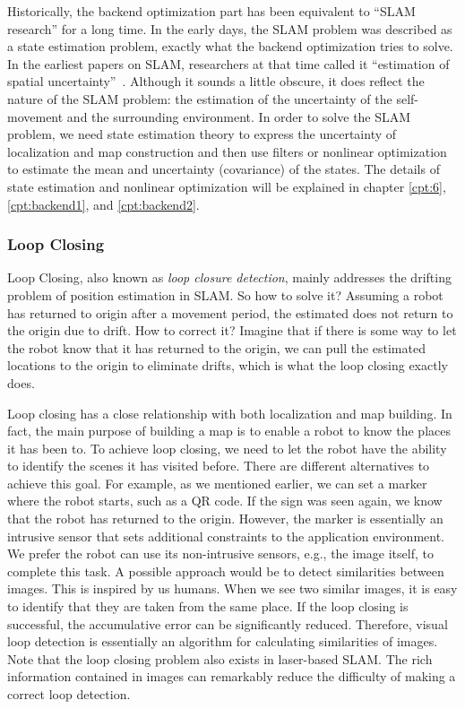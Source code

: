 Historically, the backend optimization part has been equivalent to ``SLAM research'' for a long time. In the early days, the SLAM problem was described as a state estimation problem, exactly what the backend optimization tries to solve. In the earliest papers on SLAM, researchers at that time called it ``estimation of spatial uncertainty''~\cite{Smith1986, Smith1990}. Although it sounds a little obscure, it does reflect the nature of the SLAM problem: the estimation of the uncertainty of the self-movement and the surrounding environment. In order to solve the SLAM problem, we need state estimation theory to express the uncertainty of localization and map construction and then use filters or nonlinear optimization to estimate the mean and uncertainty (covariance) of the states. The details of state estimation and nonlinear optimization will be explained in chapter \ref{cpt:6}, \ref{cpt:backend1}, and \ref{cpt:backend2}.

\subsubsection{Loop Closing}
Loop Closing, also known as \textit{loop closure detection}, mainly addresses the drifting problem of position estimation in SLAM. So how to solve it? Assuming a robot has returned to origin after a movement period, the estimated does not return to the origin due to drift. How to correct it? Imagine that if there is some way to let the robot know that it has returned to the origin, we can pull the estimated locations to the origin to eliminate drifts, which is what the loop closing exactly does.

Loop closing has a close relationship with both localization and map building. In fact, the main purpose of building a map is to enable a robot to know the places it has been to. To achieve loop closing, we need to let the robot have the ability to identify the scenes it has visited before. There are different alternatives to achieve this goal. For example, as we mentioned earlier, we can set a marker where the robot starts, such as a QR code. If the sign was seen again, we know that the robot has returned to the origin. However, the marker is essentially an intrusive sensor that sets additional constraints to the application environment. We prefer the robot can use its non-intrusive sensors, e.g., the image itself, to complete this task. A possible approach would be to detect similarities between images. This is inspired by us humans. When we see two similar images, it is easy to identify that they are taken from the same place. If the loop closing is successful, the accumulative error can be significantly reduced. Therefore, visual loop detection is essentially an algorithm for calculating similarities of images. Note that the loop closing problem also exists in laser-based SLAM. The rich information contained in images can remarkably reduce the difficulty of making a correct loop detection.

